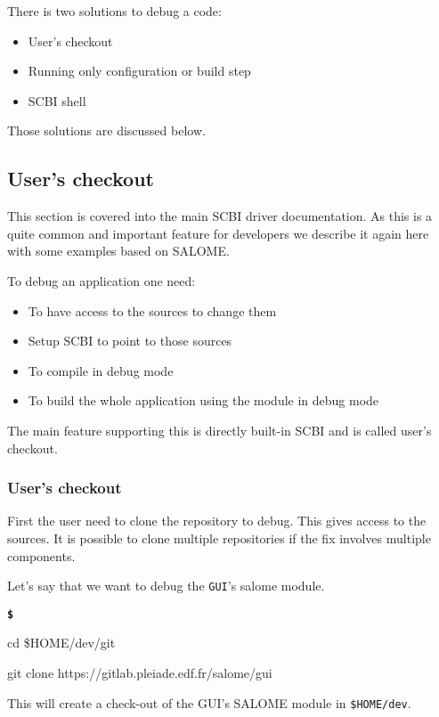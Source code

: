 \documentclass[a4paper,12pt,twoside]{article}
\newenvironment{shellcommand}{
	\begin{list}{ %
			\bfseries\texttt \$
		}{ %
			\ttfamily
			\setlength{\topsep}{-0.3ex}
			\setlength{\labelwidth}{1in}
			\setlength{\leftmargin}{0.7in}
			\setlength{\labelsep}{0.5ex}
			\setlength{\rightmargin}{0.5in}
			\setlength{\itemsep}{1ex}
			\setlength{\parsep}{0ex}
			\setlength{\listparindent}{0.5in}
		}
	}{
	\end{list}
}
\newcommand{\code}[1]{\texttt{#1}}
\begin{document}
There is two solutions to debug a code:

\begin{itemize}
	\item User's checkout
	\item Running only configuration or build step
	\item SCBI shell
\end{itemize}

Those solutions are discussed below.

\subsection{User's checkout}

This section is covered into the main SCBI driver documentation. As this is a quite common and important feature for developers we describe it again here with some examples based on SALOME.

To debug an application one need:

\begin{itemize}
	\item To have access to the sources to change them
	\item Setup SCBI to point to those sources
	\item To compile in debug mode
	\item To build the whole application using the module in debug mode
\end{itemize}

The main feature supporting this is directly built-in SCBI and is called user's checkout.

\subsubsection{User's checkout}
\label{user:checkout}
First the user need to clone the repository to debug. This gives access to the sources. It is possible to clone multiple repositories if the fix involves multiple components.

Let's say that we want to debug the \code{GUI}'s salome module.

\begin{shellcommand}
	\item cd \$HOME/dev/git
	\item git clone https://gitlab.pleiade.edf.fr/salome/gui
\end{shellcommand}

This will create a check-out of the GUI's SALOME module in \code{\$HOME/dev}.
\end{document}
